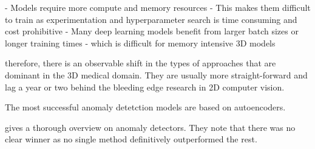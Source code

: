 

- Models require more compute and memory resources
- This makes them difficult to train as experimentation and hyperparameter search is time consuming and cost prohibitive
- Many deep learning models benefit from larger batch sizes or longer training times
 - which is difficult for memory intensive 3D models

therefore, there is an observable shift in the types of approaches that are dominant in the 3D medical domain. They are usually more straight-forward and lag a year or two behind the bleeding edge research in 2D computer vision.

The most successful anomaly detetction models are based on autoencoders.

 gives a thorough overview on anomaly detectors.
They note that there was no clear winner as no single method definitively outperformed the rest.

